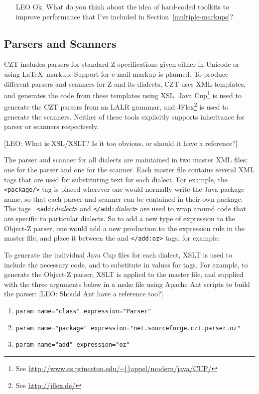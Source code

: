 \documentclass{llncs}
\begin{document}
  \begin{itemize}
    \item[LEO] Ok. What do you think about the idea of hard-coded toolkits to
               improve performance that I've included in Section~\ref{multiple-markups}?
  \end{itemize}

\subsection{Parsers and Scanners}

  CZT includes parsers for standard Z specifications given either in
  Unicode or using \LaTeX\ markup.  Support for e-mail markup is
  planned. To produce different parsers and scanners for Z and its
  dialects, CZT uses XML templates, and generates the code from these
  templates using XSL. Java Cup\footnote{See
  \url{http://www.cs.princeton.edu/\~{}appel/modern/java/CUP/}} is
  used to generate the CZT parsers from an LALR grammar, and
  JFlex\footnote{See \url{http://jflex.de/}} is used to generate the
  scanners. Neither of these tools explicitly supports inheritance for
  parser or scanners respectively.

  [LEO: What is XSL/XSLT? Is it too obvious, or should it have a reference?]

The parser and scanner for all dialects are maintained in two master
XML files: one for the parser and one for the scanner. Each master
file contains several XML tags that are used for substituting text for
each dialect. For example, the {\tt <package/>} tag is placed wherever
one would normally write the Java package name, so that each parser
and scanner can be contained in their own package. The tags {\tt
<add:}{\em dialect}{\tt >} and {\tt </add:}{\em dialect}{\tt >} are
used to wrap around code that are specific to particular dialects. So
to add a new type of expression to the Object-Z parser, one would add
a new production to the expression rule in the master file, and place
it between the {\tt <add:oz>} and {\tt </add:oz>} tags, for example.

To generate the individual Java Cup files for each dialect, XSLT is
used to include the necessary code, and to substitute in values for
tags. For example, to generate the Object-Z parser, XSLT is applied to
the master file, and supplied with the three arguments below in a make file
using Apache Ant scripts to build the parser: [LEO: Should Ant have a reference too?]
\begin{enumerate}
  \item {\tt param name="class" expression="Parser"}
  \item {\tt param name="package" expression="net.sourceforge.czt.parser.oz"}
  \item {\tt param name="add" expression="{oz}"}
\end{enumerate}
\end{document}

